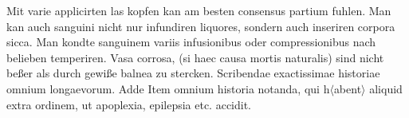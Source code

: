 Mit varie applicirten las kopfen\protect{} kan am besten consensus partium\protect{} fuhlen. Man kan auch sanguini\protect{} nicht nur infundiren liquores\protect{}, sondern auch inseriren corpora sicca.
\pend%
\pstart%
Man kondte sanguinem\protect{}
variis infusionibus\protect{} oder compressionibus nach belieben temperiren.
\pend%
\pstart%
Vasa corrosa\protect{}, (si haec causa mortis naturalis\protect{}) sind nicht be{\ss}er als durch gewi{\ss}e balnea\protect{} zu stercken.
\pend%
\pstart%
Scribendae exactissimae historiae omnium longaevorum.
Adde 
\pend%
\pstart%
Item omnium historia notanda, qui h$\langle$abent$\rangle$ aliquid extra ordinem, ut apoplexia,\protect{} epilepsia\protect{} etc. accidit.%
